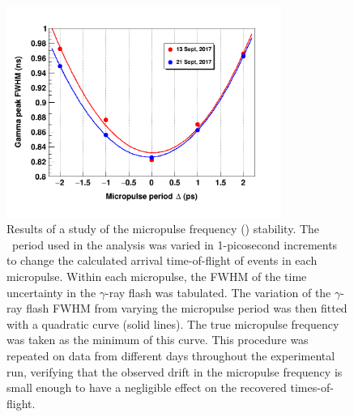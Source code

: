 \begin{figure}[tb]
    \centering
    \includegraphics[width=0.8\textwidth]{figures/RFTimeStudy.png}
    \caption[Stability of the beam pick-off (\tZero) frequency during the experiment]
    {Results of a study of the micropulse frequency (\tZero) stability. The \tZero\ period used
        in the analysis was varied in 1-picosecond increments to change the
        calculated arrival time-of-flight of events in each micropulse.
        Within each micropulse, the FWHM of
        the time uncertainty in the $\gamma$-ray flash was tabulated. The
        variation of the $\gamma$-ray flash FWHM from varying the micropulse period was
        then fitted with a quadratic curve (solid lines). The true micropulse
        frequency was taken as the minimum of this curve. This procedure was
        repeated on data from different days throughout the experimental run,
        verifying that the observed drift in the micropulse frequency is small enough to have a 
        negligible effect on the recovered times-of-flight.
    }
    \label{RFTimeStudy}
\end{figure}


